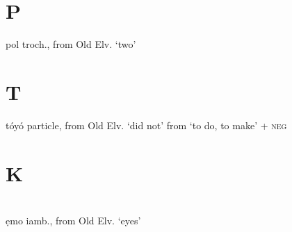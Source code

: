 \begin{multicols*}{2}
\section{P}

\begin{entrylist}
    \begin{dictentry}{pol}{
        troch., from Old Elv.  `two'
    }\label{enl:pol_M}
    \end{dictentry}
\end{entrylist}

\section{T}

\begin{entrylist}
    \begin{dictentry}{tóyó}{
        particle, from Old Elv.  `did not' from  `to do, to make' +  \textsc{neg}
    }\label{enl:toyo_HH}
    \end{dictentry}
\end{entrylist}

\section{K}

\section{\Ppa}

\section{\Tta}


\begin{entrylist}
    \begin{dictentry}{\tta ẹmo}{
        iamb., from Old Elv.  `eyes'
    }\label{enl:themo_LM}
    \end{dictentry}
\end{entrylist}

\section{\Kka}


\end{multicols*}
